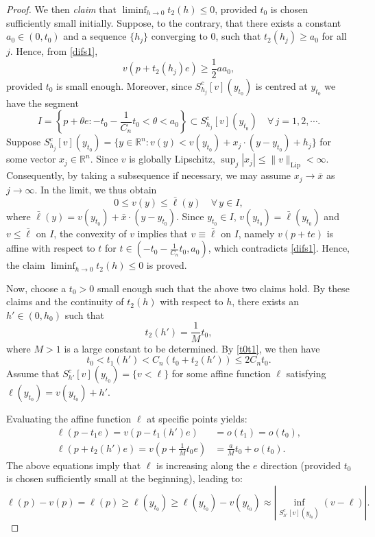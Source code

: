 \documentclass[10pt,a4paper]{amsart}
\theoremstyle{plain}
\newcommand{\0}{\textbf{0}}
\numberwithin{equation}{section}
\numberwithin{equation}{section}
\numberwithin{figure}{section}
\begin{document}
\begin{proof}
We then \emph{claim} that \(\liminf_{h\rightarrow 0}t_2(h)\leq 0\), provided $t_0$ is chosen sufficiently small initially. 
Suppose, to the contrary, that there exists a constant \(a_0 \in (0, t_0)\) and a sequence \(\{h_j\}\) converging to \(0\), such that \(t_2(h_j) \geq a_0\) for all \(j\). Hence, from \eqref{difs1},
\begin{equation}\label{t2hj}
v(p+t_2(h_j)e)\geq \frac{1}{2}aa_0,
\end{equation}
provided \(t_0\) is small enough.
Moreover, since $S^c_{h_j}[v](y_{t_0})$ is centred at $y_{t_0}$ we have the segment 
\begin{equation}
I=\left\{p+\theta e: -t_0-\frac{1}{C_n}t_0<\theta<a_0\right\} \subset S^c_{h_j}[v](y_{t_0})\quad\forall\,j=1,2,\cdots.
\end{equation}
Suppose \(S^c_{h_j}[v](y_{t_0})=\{y\in\mathbb{R}^n: v(y)<v(y_{t_0})+x_j\cdot (y-y_{t_0})+h_j\}\) for some vector \(x_j\in \mathbb{R}^n\).
Since \(v\) is globally Lipschitz, \( \sup_j |x_j| \leq \|v\|_{\text{Lip}} < \infty \). Consequently, by taking a subsequence if necessary, we may assume \(x_j \to \bar{x}\) as \(j \to \infty\).
In the limit, we thus obtain 
	\[ 0 \leq v(y) \leq \bar{\ell}(y) \quad \forall\, y \in I, \] 
where \( \bar{\ell}(y) = v(y_{t_0}) + \bar{x} \cdot (y - y_{t_0}) \). 
Since \(y_{t_0} \in I\), \(v(y_{t_0}) = \bar{\ell}(y_{t_0})\) and \(v \leq \bar{\ell}\) on \(I\), the convexity of \(v\) implies that \(v \equiv \bar{\ell}\) on \(I\), namely \(v(p + te)\) is affine with respect to \(t\) for \(t \in (-t_0 - \frac{1}{C_n}t_0, a_0)\), which contradicts \eqref{difs1}. 
Hence, the claim $\liminf_{h \to 0} t_2(h) \leq 0$ is proved.



Now, choose a $t_0>0$ small enough such that the above two claims hold. By these claims and the continuity of \(t_2(h)\) with respect to \(h\), there exists an \(h'\in(0, h_0)\) such that 
\begin{equation}
t_2(h') = \frac{1}{M}t_0,
\end{equation}
where \(M > 1\) is a large constant to be determined.
By \eqref{t0t1}, we then have 
\begin{equation}
t_0 < t_1(h') < C_n(t_0 + t_2(h')) \leq 2C_nt_0.
\end{equation}
Assume that \(S^c_{h'}[v](y_{t_0}) = \{v < \ell\}\) for some affine function \(\ell\) satisfying \(\ell(y_{t_0}) = v(y_{t_0}) + h'\).


Evaluating the affine function \(\ell\) at specific points yields:
\begin{align}
\ell(p - t_1e) = v(p - t_1(h')e) &= o(t_1) = o(t_0), \\
\ell\left(p + t_2(h')e\right) = v\left(p + \frac{1}{M}t_0e\right) &= \frac{a}{M}t_0 + o(t_0).
\end{align}
The above equations imply that \(\ell\) is increasing along the \(e\) direction (provided $t_0$ is chosen sufficiently small at the beginning), leading to:
\begin{equation}\label{makec1}
\ell(p) - v(p) = \ell(p) \geq \ell(y_{t_0}) \geq \ell(y_{t_0}) - v(y_{t_0}) \approx \left| \inf_{S^c_{h'}[v](y_{t_0})} (v - \ell) \right|.
\end{equation}


\end{proof}
\end{document}
